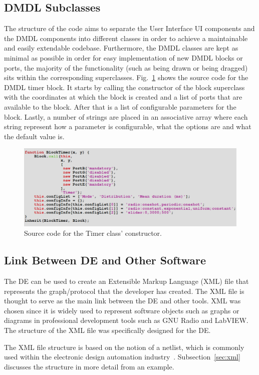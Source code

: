 \documentclass[journal,comsoc]{IEEEtran}
\begin{document}
\subsection{DMDL Subclasses}
The structure of the code aims to separate the User Interface UI components and the DMDL components
into different classes in order to achieve a maintainable and easily extendable codebase.
Furthermore, the DMDL classes are kept as minimal as possible in order for easy implementation
of new DMDL blocks or ports, the majority of the functionality (such as being drawn or being
dragged) sits within the corresponding superclasses. Fig.~\ref{fig:timer_src} shows the source code
for the DMDL timer block. It starts by calling the constructor of the block superclass with the
coordinates at which the block is created and a list of ports that are available to the block.
After that is a list of configurable parameters for the block. Lastly, a number of strings
are placed in an associative array where each string represent how a parameter is configurable,
what the options are and what the default value is.
\begin{figure}[!t]
\centering
    \includegraphics[width=\columnwidth]{timer_src.png}
    \caption{Source code for the Timer class' constructor.}
    \label{fig:timer_src}
\end{figure}

\subsection{Link Between DE and Other Software}
The DE can be used to create an Extensible Markup Language (XML) file that represents the
graph/protocol that the developer has created. The XML file is thought to serve as the main link
between the DE and other tools. XML was chosen since it is widely used to represent software
objects such as graphs or diagrams in professional development tools such as GNU Radio and
LabVIEW. The structure of the XML file was specifically designed for the DE.

The XML file structure is based on the notion of a netlist, which is commonly used within the
electronic design automation industry~\cite{netlist}. Subsection~\ref{sec:xml} discusses the
structure in more detail from an example.
\end{document}
